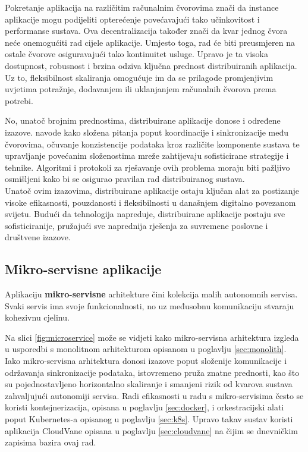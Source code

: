 \documentclass[times, utf8, diplomski]{fer}
\begin{document}
Pokretanje aplikacija na različitim računalnim čvorovima znači da instance aplikacije mogu podijeliti opterećenje povećavajući tako učinkovitost i performanse sustava. Ova decentralizacija također znači da kvar jednog čvora neće onemogućiti rad cijele aplikacije. Umjesto toga, rad će biti preusmjeren na ostale čvorove osiguravajući tako kontinuitet usluge. Upravo je ta visoka dostupnost, robusnost i brzina odziva ključna prednost distribuiranih aplikacija. Uz to, fleksibilnost skaliranja omogućuje im da se prilagode promjenjivim uvjetima potražnje, dodavanjem ili uklanjanjem računalnih čvorova prema potrebi.

No, unatoč brojnim prednostima, distribuirane aplikacije donose i određene izazove. \citet{zarko_raspodijeljeni_2013} navode kako složena pitanja poput koordinacije i sinkronizacije među čvorovima, očuvanje konzistencije podataka kroz različite komponente sustava te upravljanje povećanim složenostima mreže zahtijevaju sofisticirane strategije i tehnike. Algoritmi i protokoli za rješavanje ovih problema moraju biti pažljivo osmišljeni kako bi se osigurao pravilan rad distribuiranog sustava. \\

Unatoč ovim izazovima, distribuirane aplikacije ostaju ključan alat za postizanje visoke efikasnosti, pouzdanosti i fleksibilnosti u današnjem digitalno povezanom svijetu. Budući da tehnologija napreduje, distribuirane aplikacije postaju sve sofisticiranije, pružajući sve naprednija rješenja za suvremene poslovne i društvene izazove.

\subsection{Mikro-servisne aplikacije}
\label{sec:microservices}

Aplikaciju \textbf{mikro-servisne} arhitekture  čini kolekcija malih autonomnih servisa. Svaki servis ima svoje funkcionalnosti, no uz međusobnu komunikaciju stvaraju kohezivnu cjelinu.

Na slici \ref{fig:microservice} može se vidjeti kako mikro-servisna arhitektura izgleda u usporedbi s monolitnom arhitekturom opisanom u poglavlju \ref{sec:monolith}. Iako mikro-servisna arhitektura donosi izazove poput složenije komunikacije i održavanja sinkronizacije podataka, istovremeno pruža znatne prednosti, kao što su pojednostavljeno horizontalno skaliranje i smanjeni rizik od kvarova sustava zahvaljujući autonomiji servisa.
Radi efikasnosti u radu s mikro-servisima često se koristi kontejnerizacija, opisana u poglavlju \ref{sec:docker}, i  orkestracijski alati poput Kubernetes-a opisanog u poglavlju \ref{sec:k8s}. Upravo takav sustav koristi aplikacija CloudVane opisana u poglavlju \ref{sec:cloudvane} na čijim se dnevničkim zapisima bazira ovaj rad.
\end{document}
